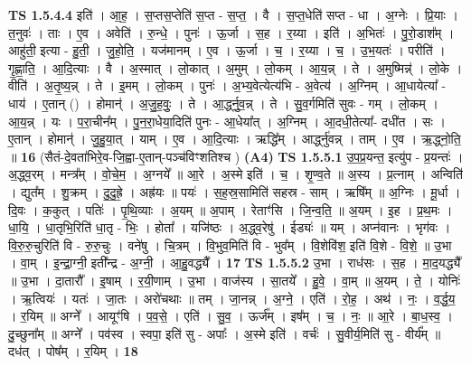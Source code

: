 \documentclass[17pt]{extarticle}
\begin{document}
                  \newline
                                \textbf{ TS 1.5.4.4} \newline
                  इति॑ । आ॒ह॒ । स॒प्तस॒प्तेति॑ स॒प्त - स॒प्त॒ । वै । स॒प्त॒धेति॑ सप्त - धा । अ॒ग्नेः । प्रि॒याः । त॒नुवः॑ । ताः । ए॒व । अवेति॑ । रु॒न्धे॒ । पुनः॑ । ऊ॒र्जा । स॒ह । र॒य्या । इति॑ । अ॒भितः॑ । पु॒रो॒डाश᳚म् । आहु॑ती॒ इत्या - हु॒ती॒ । जु॒हो॒ति॒ । यज॑मानम् । ए॒व । ऊ॒र्जा । च॒ । र॒य्या । च॒ । उ॒भ॒यतः॑ । परीति॑ । गृ॒ह्णा॒ति॒ । आ॒दि॒त्याः । वै । अ॒स्मात् । लो॒कात् । अ॒मुम् । लो॒कम् । आ॒य॒न्न् । ते । अ॒मुष्मिन्न्॑ । लो॒के । वीति॑ । अ॒तृ॒ष्य॒न्न् । ते । इ॒मम् । लो॒कम् । पुनः॑ । अ॒भ्य॒वेत्येत्य॑भि - अ॒वेत्य॑ । अ॒ग्निम् । आ॒धायेत्या᳚ - धाय॑ । ए॒तान् () । होमान्॑ । अ॒जु॒ह॒वुः॒ । ते । आ॒र्द्ध्नु॒व॒न्न् । ते । सु॒व॒र्गमिति॑ सुवः - गम् । लो॒कम् । आ॒य॒न्न् । यः । प॒रा॒चीन᳚म् । पु॒न॒रा॒धेया॒दिति॑ पुनः - आ॒धेया᳚त् । अ॒ग्निम् । आ॒दधी॒तेत्या᳚- दधी॑त । सः । ए॒तान् । होमान्॑ । जु॒हु॒या॒त् । याम् । ए॒व । आ॒दि॒त्याः । ऋद्धि᳚म् । आर्द्ध्नु॑वन्न् । ताम् । ए॒व । ऋ॒द्ध्नो॒ति॒ ॥ \textbf{  16} \newline
                  \newline
                      (सैतं-दे॒वता॑भिरे॒व-जि॒ह्वा-ए॒तान्-पञ्च॑विꣳशतिश्च )  \textbf{(A4)} \newline \newline
                                \textbf{ TS 1.5.5.1} \newline
                  उ॒प॒प्र॒यन्त॒ इत्यु॑प - प्र॒यन्तः॑ । अ॒द्ध्व॒रम् । मन्त्र᳚म् । वो॒चे॒म॒ । अ॒ग्नये᳚ ॥ आ॒रे । अ॒स्मे इति॑ । च॒ । शृ॒ण्व॒ते ॥ अ॒स्य । प्र॒त्नाम् । अन्विति॑ । द्युत᳚म् । शु॒क्रम् । दु॒दु॒ह्रे॒ । अह्र॑यः ॥ पयः॑ । स॒ह॒स्र॒सामिति॑ सहस्र - साम् । ऋषि᳚म् ॥ अ॒ग्निः । मू॒र्धा । दि॒वः । क॒कुत् । पतिः॑ । पृ॒थि॒व्याः । अ॒यम् ॥ अ॒पाम् । रेताꣳ॑सि । जि॒न्व॒ति॒ ॥ अ॒यम् । इ॒ह । प्र॒थ॒मः । धा॒यि॒ । धा॒तृभि॒रिति॑ धा॒तृ - भिः॒ । होता᳚ । यजि॑ष्ठः । अ॒द्ध्व॒रेषु॑ । ईड्यः॑ ॥ यम् । अप्न॑वानः । भृग॑वः । वि॒रु॒रु॒चुरिति॑ वि - रु॒रु॒चुः । वने॑षु । चि॒त्रम् । वि॒भुव॒मिति॑ वि - भुव᳚म् । वि॒शेवि॑श॒ इति॑ वि॒शे - वि॒शे॒ ॥ उ॒भा । वा॒म् । इ॒न्द्रा॒ग्नी॒ इती᳚न्द्र - अ॒ग्नी॒ । आ॒हु॒वद्ध्यै᳚ । \textbf{  17} \newline
                  \newline
                                \textbf{ TS 1.5.5.2} \newline
                  उ॒भा । राध॑सः । स॒ह । मा॒द॒यद्ध्यै᳚ ॥ उ॒भा । दा॒तारौ᳚ । इ॒षाम् । र॒यी॒णाम् । उ॒भा । वाज॑स्य । सा॒तये᳚ । हु॒वे॒ । वा॒म् ॥ अ॒यम् । ते॒ । योनिः॑ । ऋ॒त्वियः॑ । यतः॑ । जा॒तः । अरो॑चथाः ॥ तम् । जा॒नन्न् । अ॒ग्ने॒ । एति॑ । रो॒ह॒ । अथ॑ । नः॒ । व॒र्द्ध॒य॒ । र॒यिम् ॥ अग्ने᳚ । आयूꣳ॑षि । प॒व॒से॒ । एति॑ । सु॒व॒ । ऊर्ज᳚म् । इष᳚म् । च॒ । नः॒ ॥ आ॒रे । बा॒ध॒स्व॒ । दु॒च्छुना᳚म् ॥ अग्ने᳚ । पव॑स्व । स्वपा॒ इति॑ सु - अपाः᳚ । अ॒स्मे इति॑ । वर्चः॑ । सु॒वीर्य॒मिति॑ सु - वीर्य᳚म् ॥ दध॑त् । पोष᳚म् । र॒यिम् । \textbf{  18} \newline
\end{document}
